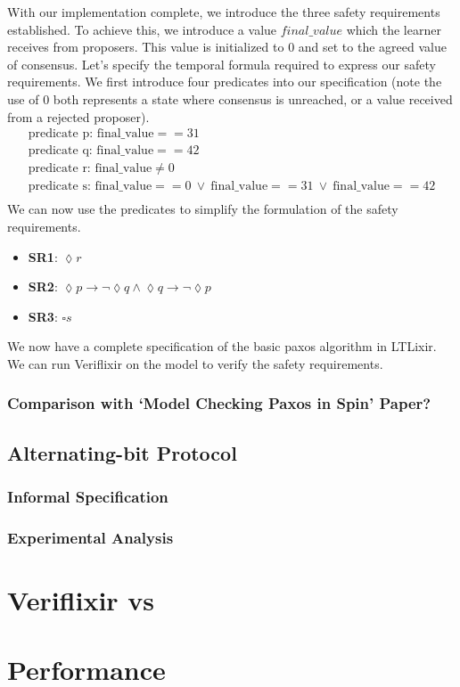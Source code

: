 \par
With our implementation complete, we introduce the three safety requirements established. To achieve this, we introduce a value $final\_value$ which the learner receives from proposers. This value is initialized to $0$ and set to the agreed value of consensus. Let's specify the temporal formula required to express our safety requirements. We first introduce four predicates into our specification (note the use of $0$ both represents a state where consensus is unreached, or a value received from a rejected proposer).
\[
\begin{array}{l}
\text{predicate p: final\_value} == 31 \\
\text{predicate q: final\_value} == 42 \\
\text{predicate r: final\_value} \neq 0 \\
\text{predicate s: final\_value} == 0 \ \lor \ \text{final\_value} == 31 \ \lor \ \text{final\_value} == 42 \\
\end{array}
\]
We can now use the predicates to simplify the formulation of the safety requirements.
\begin{itemize}
    \item \textbf{SR1}: $\lozenge r$
    \item \textbf{SR2}: $\lozenge p \rightarrow \neg \lozenge q \land \lozenge q \rightarrow \neg \lozenge p$ 
    \item \textbf{SR3}: $\square s$
\end{itemize}
We now have a complete specification of the basic paxos algorithm in LTLixir. We can run Veriflixir on the model to verify the safety requirements.

\subsubsection{Comparison with `Model Checking Paxos in Spin' Paper?}
\subsection{Alternating-bit Protocol} \label{sec:ab}
\subsubsection{Informal Specification}
\subsubsection{Experimental Analysis}
\section{Veriflixir vs } \label{sec:vs}
\section{Performance} \label{sec:perf}